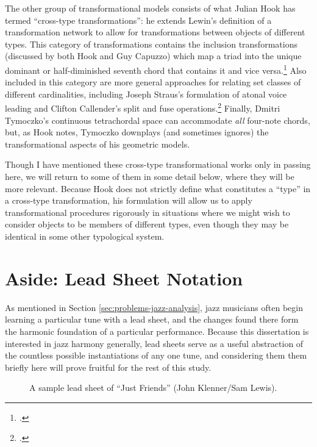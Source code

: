 The other group of transformational models consists of what Julian Hook has
termed “cross-type transformations”: he extends Lewin’s definition of a
transformation network to allow for transformations between objects of
different types. This category of transformations contains the
inclusion transformations (discussed by both Hook and Guy Capuzzo) which map a
triad into the unique dominant or half-diminished seventh chord that contains
it and vice versa.\footcites{hook:2002,capuzzo:2004} Also included in this
category are more general approaches for relating set classes of different
cardinalities, including Joseph Straus’s formulation of atonal voice leading
and Clifton Callender’s split and fuse
operations.\footcites{straus:2003,callender:1998} Finally, Dmitri Tymoczko’s
continuous tetrachordal space can accommodate \emph{all} four-note chords, but,
as Hook notes, Tymoczko downplays (and sometimes ignores) the transformational
aspects of his geometric models.

Though I have mentioned these cross-type transformational works only in
passing here, we will return to some of them in some detail below, where they
will be more relevant. Because Hook does not strictly define what constitutes
a “type” in a cross-type transformation, his formulation will allow us to
apply transformational procedures rigorously in situations where we might wish
to consider objects to be members of different types, even though they may be
identical in some other typological system.


\section{Aside: Lead Sheet Notation}
\label{sec:lead-sheets} %

As mentioned in Section \ref{sec:problems-jazz-analysis}, jazz musicians often
begin learning a particular tune with a lead sheet, and the changes found
there form the harmonic foundation of a particular performance. Because this
dissertation is interested in jazz harmony generally, lead sheets serve as a
useful abstraction of the countless possible instantiations of any one tune,
and considering them them briefly here will prove fruitful for the rest of
this study.

\begin{figure}[p]
  \caption{A sample lead sheet of ``Just Friends'' (John Klenner/Sam Lewis).}
  \label{ls:just-friends}
\end{figure}


